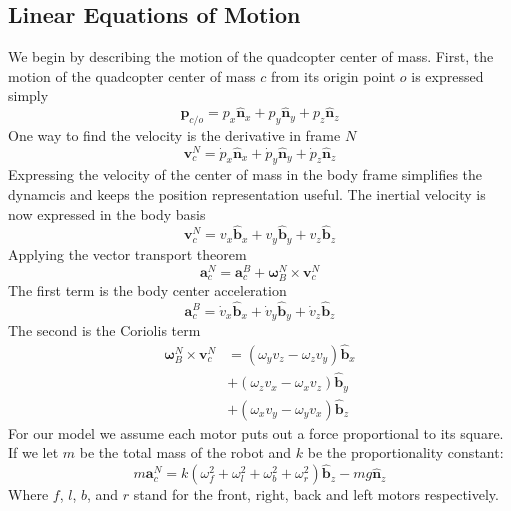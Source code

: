\documentclass[lettersize,journal]{IEEEtran}
\begin{document}
\subsection{Linear Equations of Motion}
We begin by describing the motion of the quadcopter center of mass.
First, the motion of the quadcopter center of mass $c$ from its origin point $o$ is expressed simply
\begin{equation}
  \mathbf{p}_{c/o} = p_x \mathbf{\hat{n}}_x + p_y \mathbf{\hat{n}}_y + p_z \mathbf{\hat{n}}_z
\end{equation}
One way to find the velocity is the derivative in frame $N$
\begin{equation}
  \mathbf{v}^N_c = \dot{p}_x \mathbf{\hat{n}}_x + \dot{p}_y \mathbf{\hat{n}}_y + \dot{p}_z \mathbf{\hat{n}}_z \label{EQN:VelocityInertial}
\end{equation}
Expressing the velocity of the center of mass in the body frame simplifies the dynamcis and keeps the position representation useful.
The inertial velocity is now expressed in the body basis
\begin{equation}
  \mathbf{v}^N_c = v_x \mathbf{\hat{b}}_x + v_y \mathbf{\hat{b}}_y + v_z \mathbf{\hat{b}}_z \label{EQN:VelocityBody}
\end{equation}
Applying the vector transport theorem
\begin{equation}
  \mathbf{a}^N_c = \mathbf{a}^B_c + {\boldsymbol\omega^N_B}\times\mathbf{v}^N_c
\end{equation}
The first term is the body center acceleration
\begin{equation}
  \mathbf{a}^B_c = \dot{v}_x \mathbf{\hat{b}}_x + \dot{v}_y \mathbf{\hat{b}}_y + \dot{v}_z \mathbf{\hat{b}}_z
\end{equation}
The second is the Coriolis term
\begin{align}
  {\boldsymbol\omega^N_B}\times\mathbf{v}^N_c &= \left(\omega_yv_z-\omega_zv_y\right) \mathbf{\hat{b}}_x \nonumber\\&+ \left(\omega_zv_x-\omega_xv_z\right) \mathbf{\hat{b}}_y \nonumber\\&+ \left(\omega_xv_y-\omega_yv_x\right) \mathbf{\hat{b}}_z
\end{align}
For our model we assume each motor puts out a force proportional to its square.
If we let $m$ be the total mass of the robot and $k$ be the proportionality constant:
\begin{equation}
  m\mathbf{a}^N_c = k \left(\omega_f^2 + \omega_l^2 + \omega_b^2 + \omega_r^2\right) \mathbf{\hat{b}}_z - mg \mathbf{\hat{n}}_z \label{EQN:LinearEOM}
\end{equation}
Where $f$, $l$, $b$, and $r$ stand for the front, right, back and left motors respectively. 
\end{document}

